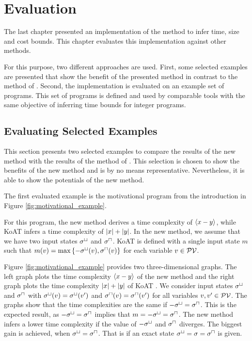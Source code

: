 \section{Evaluation}

The last chapter presented an implementation of the method to infer time, size and cost bounds.
This chapter evaluates this implementation against other methods.

For this purpose, two different approaches are used.
First, some selected examples are presented that show the benefit of the presented method in contrast to the method of \cite{koat}.
Second, the implementation is evaluated on an example set of programs.
This set of programs is defined and used by comparable tools with the same objective of inferring time bounds for integer programs.

\subsection{Evaluating Selected Examples}

This section presents two selected examples to compare the results of the new method with the results of the method of \cite{koat}.
This selection is chosen to show the benefits of the new method and is by no means representative.
Nevertheless, it is able to show the potentials of the new method.

The first evaluated example is the motivational program from the introduction in Figure \ref{fig:motivational_example}.



For this program, the new method derives a time complexity of $\left\langle x-y \right\rangle$, while KoAT \cite{koat} infers a time complexity of $\left|x\right|+\left|y\right|$.
In the new method, we assume that we have two input states ${\sigma^\sqcup}$ and ${\sigma^\sqcap}$.
KoAT \cite{koat} is defined with a single input state $m$ such that $m(v) = \max \left\lbrace -{\sigma^\sqcup}(v),{\sigma^\sqcap}(v) \right\rbrace$ for each variable $v \in \mathcal{PV}$.

Figure \ref{fig:motivational_example} provides two three-dimensional graphs.
The left graph plots the time complexity $\left\langle x-y \right\rangle$ of the new method and the right graph plots the time complexity $\left|x\right|+\left|y\right|$ of KoAT \cite{koat}.
We consider input states ${\sigma^\sqcup}$ and ${\sigma^\sqcap}$ with ${\sigma^\sqcup}(v) = {\sigma^\sqcup}(v')$ and ${\sigma^\sqcap}(v) = {\sigma^\sqcap}(v')$ for all variables $v, v' \in \mathcal{PV}$.
The graphs show that the time complexities are the same if $-{\sigma^\sqcup} = {\sigma^\sqcap}$.
This is the expected result, as $-{\sigma^\sqcup} = {\sigma^\sqcap}$ implies that $m = -{\sigma^\sqcup} = {\sigma^\sqcap}$.
The new method infers a lower time complexity if the value of $-{\sigma^\sqcup}$ and ${\sigma^\sqcap}$ diverges.
The biggest gain is achieved, when ${\sigma^\sqcup} = {\sigma^\sqcap}$.
That is if an exact state ${\sigma^\sqcup} = \sigma = {\sigma^\sqcap}$ is given.

